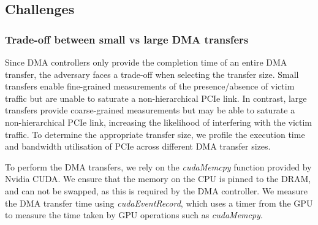 \subsection{Challenges}
\label{subsec:interconnect-sc-dma-challenges}

\subsubsection{Trade-off between small vs large DMA transfers}
\label{subsubsec:interconnect-sc-dma-challenges-trade-off-small-v-large-tx}

Since DMA controllers only provide the completion time of an entire DMA transfer, the adversary faces a trade-off when selecting the transfer size. 
Small transfers enable fine-grained measurements of the presence/absence of victim traffic but are unable to saturate a non-hierarchical PCIe link. 
In contrast, large transfers provide coarse-grained measurements but may be able to saturate a non-hierarchical PCIe link, increasing the likelihood of interfering with the victim traffic.
To determine the appropriate transfer size, we profile the execution time and bandwidth utilisation of PCIe across different DMA transfer sizes.

To perform the DMA transfers, we rely on the \textit{cudaMemcpy} function provided by Nvidia CUDA.
We ensure that the memory on the CPU is pinned to the DRAM, and can not be swapped, as this is required by the DMA controller.
We measure the DMA transfer time using \textit{cudaEventRecord}, which uses a timer from the GPU to measure the time taken by GPU operations such as \textit{cudaMemcpy}.



